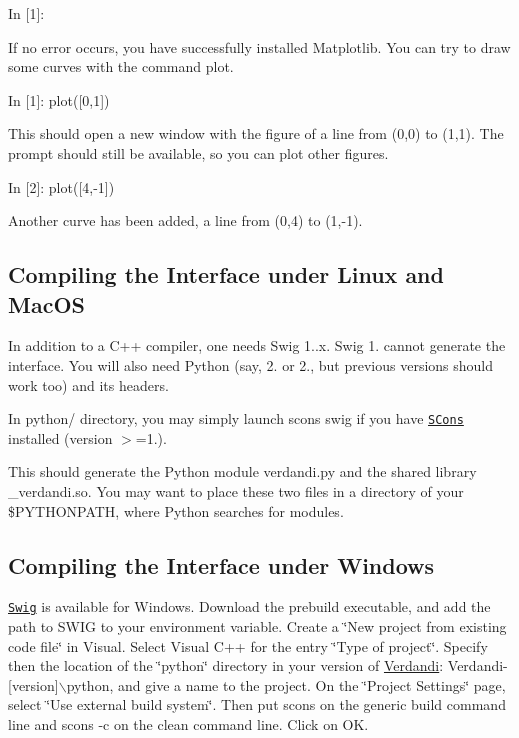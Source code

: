 \documentclass{tufte-book}
\begin{document}
 \begin{frame_python}
In [1]:
\end{frame_python}


\-If no error occurs, you have successfully installed \-Matplotlib. \-You can try to draw some curves with the command plot.

 \begin{frame_python}
In [1]: plot([0,1])
\end{frame_python}


\-This should open a new window with the figure of a line from (0,0) to (1,1). \-The prompt should still be available, so you can plot other figures.

 \begin{frame_python}
In [2]: plot([4,-1])
\end{frame_python}


\-Another curve has been added, a line from (0,4) to (1,-\/1).\hypertarget{python_compilation}{}\subsection{\-Compiling the Interface under Linux and Mac\-O\-S}\label{python_compilation}
\-In addition to a \-C++ compiler, one needs \-Swig 1..\-x. \-Swig 1. cannot generate the interface. \-You will also need \-Python (say, 2. or 2., but previous versions should work too) and its headers.

\-In {\ttfamily python/} directory, you may simply launch {\ttfamily scons swig} if you have \href{http://www.scons.org/}{\tt \-S\-Cons} installed (version $>$=1.).

\-This should generate the \-Python module {\ttfamily verdandi.\-py} and the shared library {\ttfamily \-\_\-verdandi.\-so}. \-You may want to place these two files in a directory of your {\ttfamily \$\-P\-Y\-T\-H\-O\-N\-P\-A\-T\-H}, where \-Python searches for modules.\hypertarget{python_compilationw}{}\subsection{\-Compiling the Interface under Windows}\label{python_compilationw}
\href{http://www.swig.org/}{\tt \-Swig} is available for \-Windows. \-Download the prebuild executable, and add the path to \-S\-W\-I\-G to your environment variable. \-Create a \char`\"{}\-New project from existing code file\char`\"{} in \-Visual. \-Select \-Visual \-C++ for the entry \char`\"{}\-Type of project\char`\"{}. \-Specify then the location of the \char`\"{}python\char`\"{} directory in your version of \hyperlink{namespace_verdandi}{\-Verdandi}\-: {\ttfamily \-Verdandi-\/\mbox{[}version\mbox{]}$\backslash$python}, and give a name to the project. \-On the \char`\"{}\-Project Settings\char`\"{} page, select \char`\"{}\-Use external build system\char`\"{}. \-Then put {\ttfamily scons} on the generic build command line and {\ttfamily scons -\/c} on the clean command line. \-Click on \-O\-K.
\end{document}
